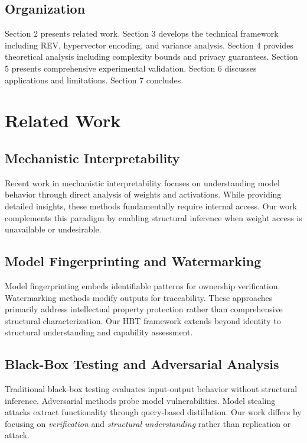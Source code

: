 \documentclass[11pt,a4paper]{article}
\begin{document}
\subsection{Organization}

Section 2 presents related work. Section 3 develops the technical framework including REV, hypervector encoding, and variance analysis. Section 4 provides theoretical analysis including complexity bounds and privacy guarantees. Section 5 presents comprehensive experimental validation. Section 6 discusses applications and limitations. Section 7 concludes.

\section{Related Work}

\subsection{Mechanistic Interpretability}

Recent work in mechanistic interpretability \citep{elhage2021mathematical,olah2020zoom,conmy2023automated} focuses on understanding model behavior through direct analysis of weights and activations. While providing detailed insights, these methods fundamentally require internal access. Our work complements this paradigm by enabling structural inference when weight access is unavailable or undesirable.

\subsection{Model Fingerprinting and Watermarking}

Model fingerprinting \citep{adi2018turning,chen2019leveraging} embeds identifiable patterns for ownership verification. Watermarking methods \citep{kirchenbauer2023watermark} modify outputs for traceability. These approaches primarily address intellectual property protection rather than comprehensive structural characterization. Our HBT framework extends beyond identity to structural understanding and capability assessment.

\subsection{Black-Box Testing and Adversarial Analysis}

Traditional black-box testing \citep{ribeiro2016should,lundberg2017unified} evaluates input-output behavior without structural inference. Adversarial methods \citep{wallace2019universal,ziegler2022adversarial} probe model vulnerabilities. Model stealing attacks \citep{tramer2016stealing,jagielski2020high} extract functionality through query-based distillation. Our work differs by focusing on \textit{verification} and \textit{structural understanding} rather than replication or attack.
\end{document}
